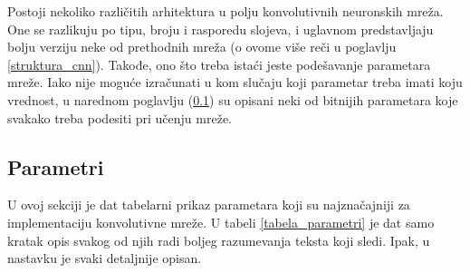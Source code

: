 \documentclass[a4paper]{article}
\begin{document}
Postoji nekoliko različitih arhitektura u polju konvolutivnih neuronskih mreža. One se razlikuju po tipu, broju i rasporedu slojeva, i uglavnom predstavljaju bolju verziju neke od prethodnih mreža (o ovome više reči u poglavlju \ref{struktura_cnn}). Takođe, ono što treba istaći jeste podešavanje parametara mreže. Iako nije moguće izračunati u kom slučaju koji parametar treba imati koju vrednost, u narednom poglavlju (\ref{parametri_sec}) su opisani neki od bitnijih parametara koje svakako treba podesiti pri učenju mreže.


\subsection{Parametri}
\label{parametri_sec}

U ovoj sekciji je dat tabelarni prikaz parametara koji su najznačajniji za implementaciju konvolutivne mreže. U tabeli \ref{tabela_parametri} je dat samo kratak opis svakog od njih radi boljeg razumevanja teksta koji sledi. Ipak, u nastavku je svaki detaljnije opisan.
\end{document}
